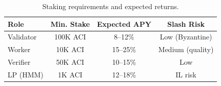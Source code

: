 \begin{table}[H]
\centering
\small
\begin{tabular}{lccc}
\toprule
\textbf{Role} & \textbf{Min. Stake} & \textbf{Expected APY} & \textbf{Slash Risk} \\
\midrule
Validator & 100K ACI & 8--12\% & Low (Byzantine) \\
Worker & 10K ACI & 15--25\% & Medium (quality) \\
Verifier & 50K ACI & 10--15\% & Low \\
LP (HMM) & 1K ACI & 12--18\% & IL risk \\
\bottomrule
\end{tabular}
\caption{Staking requirements and expected returns.}
\label{tab:staking}
\end{table}

